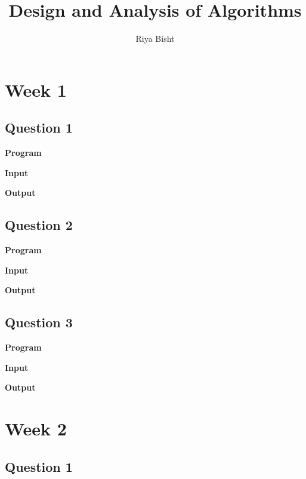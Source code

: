 \documentclass{article}
\title{Design and Analysis of Algorithms}
\author{Riya Bisht}
\begin{document}
\maketitle
\newpage

\tableofcontents
\newpage

\section{Week 1}

\subsection{Question 1}

\newline 

\noindent \textbf{\large{Program}}

\newpage
\noindent \textbf{\large{Input}}

\noindent \textbf{\large{Output}}


\newpage
\subsection{Question 2}

\newline 

\noindent \textbf{\large{Program}}

\newpage
\noindent \textbf{\large{Input}}

\noindent \textbf{\large{Output}}


\newpage
\subsection{Question 3}

\newline 

\noindent \textbf{\large{Program}}

\newpage
\noindent \textbf{\large{Input}}

\noindent \textbf{\large{Output}}


\newpage
\section{Week 2}

\subsection{Question 1}

\newline 
\end{document}
